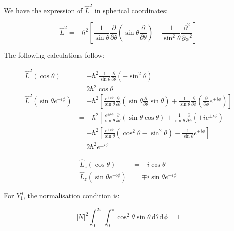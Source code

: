 \documentclass[12pt]{article}
\begin{document}
We have the expression of $\hat{L}^{2}$ in spherical coordinates:

\begin{equation}
    \hat{L}^{2} = -\hbar^{2} \left[ \frac{1}{\sin \theta} \frac{\partial}{\partial \theta} \left( \sin \theta \frac{\partial}{\partial \theta} \right) + \frac{1}{\sin^{2} \theta} \frac{\partial^{2}}{\partial \phi^{2}} \right]
\end{equation}


The following calculations follow:

\begin{equation}
\begin{split}
    \hat{L}^{2} (\cos{\theta}) &= -\hbar^{2} \frac{1}{\sin{\theta}} \frac{\partial}{\partial \theta} \left( -\sin^{2}{\theta} \right) \\
    &= 2\hbar^{2} \cos{\theta} \\
    \hat{L}^{2} \left( \sin{\theta} e^{\pm i\phi} \right) &= -\hbar^{2} \left[ \frac{e^{\pm i\phi}}{\sin{\theta}} \frac{\partial}{\partial \theta} \left( \sin{\theta} \frac{\partial}{\partial \theta} \sin{\theta} \right) + \frac{1}{\sin{\theta}} \frac{\partial}{\partial \phi} \left( \frac{\partial}{\partial \phi} e^{\pm i\phi} \right) \right] \\
    &= -\hbar^{2} \left[ \frac{e^{\pm i\phi}}{\sin{\theta}} \frac{\partial}{\partial \theta} \left( \sin{\theta} \cos{\theta} \right) + \frac{1}{\sin{\theta}} \frac{\partial}{\partial \phi} \left( \pm i e^{\pm i\phi} \right) \right] \\
    &= -\hbar^{2} \left[ \frac{e^{\pm i\phi}}{\sin{\theta}} \left( \cos^{2}{\theta} - \sin^{2}{\theta} \right) - \frac{1}{\sin{\theta}} e^{\pm i\phi} \right] \\
    &= 2\hbar^{2} e^{\pm i\phi}
\end{split}
\end{equation}

\begin{equation}
\begin{split}
    \hat{L}_{z} (\cos{\theta}) &= -i \cos{\theta} \\
    \hat{L}_{z} \left( \sin{\theta} e^{\pm i\phi} \right) &= \mp i \sin{\theta} e^{\pm i\phi}
\end{split}
\end{equation}

For $Y_{1}^{0}$, the normalisation condition is:

\begin{equation}
    \left\lvert N \right\rvert^{2} \int_{0}^{2\pi} \int_{0}^{\pi} \cos^{2}{\theta} \sin{\theta} \, \mathrm{d}\theta \, \mathrm{d}\phi = 1
\end{equation}
\end{document}
